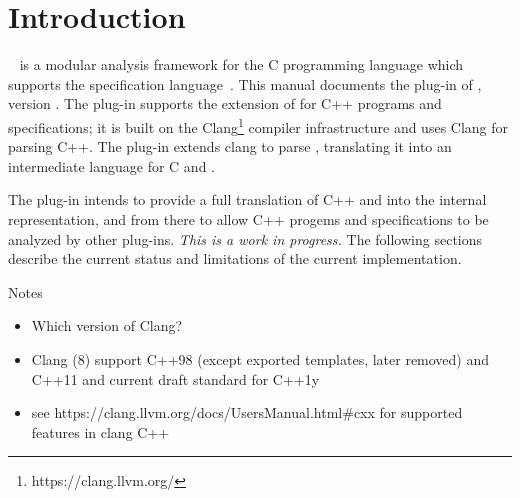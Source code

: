 \chapter{Introduction}

\framac~\cite{userman,fac15} is a modular analysis framework for the C
programming language which supports the \acsl specification
language~\cite{acsl}. This manual documents the \fclang plug-in of \framac,
version \fclangversion. 
The \fclang plug-in supports the \acslpp extension of \acsl for C++ programs and specifications; 
it is built on the Clang\footnote{https://clang.llvm.org/} compiler infrastructure and uses Clang for 
parsing C++. The plug-in extends clang to parse \acslpp, translating it into an intermediate language for C and \acsl.

The \fclang plug-in intends to provide a full translation of C++ and \acslpp into the \framac internal representation, and from there to allow C++ progems and \acslpp specifications to be analyzed by other \framac plug-ins. 
\textit{This is a work in progress.}
The following sections describe the current status and limitations of the current implementation.


Notes
\begin{itemize}
	\item Which version of Clang?
	\item Clang (8) support C++98 (except exported templates, later removed) and C++11 and current draft standard for C++1y 
	\item see https://clang.llvm.org/docs/UsersManual.html\#cxx for supported features in clang C++
\end{itemize}




